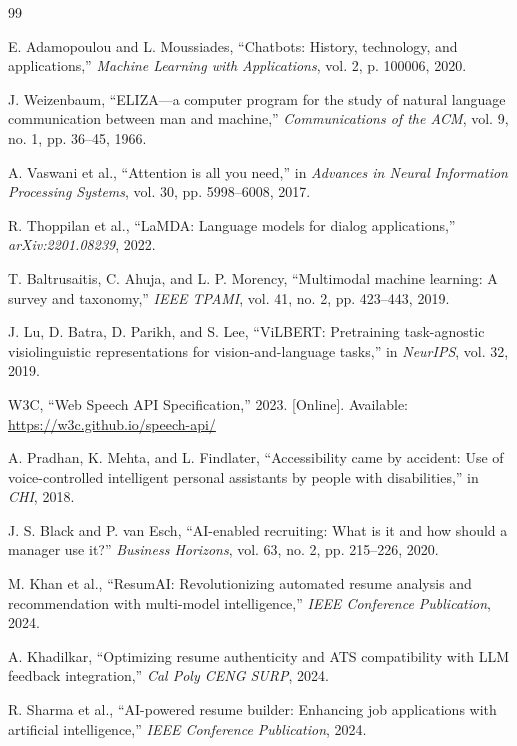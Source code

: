 \documentclass[conference]{IEEEtran}
\begin{document}
\begin{thebibliography}{99}

E. Adamopoulou and L. Moussiades, ``Chatbots: History, technology, and applications,'' \textit{Machine Learning with Applications}, vol. 2, p. 100006, 2020.

J. Weizenbaum, ``ELIZA---a computer program for the study of natural language communication between man and machine,'' \textit{Communications of the ACM}, vol. 9, no. 1, pp. 36--45, 1966.

A. Vaswani et al., ``Attention is all you need,'' in \textit{Advances in Neural Information Processing Systems}, vol. 30, pp. 5998--6008, 2017.

R. Thoppilan et al., ``LaMDA: Language models for dialog applications,'' \textit{arXiv:2201.08239}, 2022.

T. Baltrusaitis, C. Ahuja, and L. P. Morency, ``Multimodal machine learning: A survey and taxonomy,'' \textit{IEEE TPAMI}, vol. 41, no. 2, pp. 423--443, 2019.

J. Lu, D. Batra, D. Parikh, and S. Lee, ``ViLBERT: Pretraining task-agnostic visiolinguistic representations for vision-and-language tasks,'' in \textit{NeurIPS}, vol. 32, 2019.

W3C, ``Web Speech API Specification,'' 2023. [Online]. Available: \url{https://w3c.github.io/speech-api/}

A. Pradhan, K. Mehta, and L. Findlater, ``Accessibility came by accident: Use of voice-controlled intelligent personal assistants by people with disabilities,'' in \textit{CHI}, 2018.

J. S. Black and P. van Esch, ``AI-enabled recruiting: What is it and how should a manager use it?'' \textit{Business Horizons}, vol. 63, no. 2, pp. 215--226, 2020.

M. Khan et al., ``ResumAI: Revolutionizing automated resume analysis and recommendation with multi-model intelligence,'' \textit{IEEE Conference Publication}, 2024.

A. Khadilkar, ``Optimizing resume authenticity and ATS compatibility with LLM feedback integration,'' \textit{Cal Poly CENG SURP}, 2024.

R. Sharma et al., ``AI-powered resume builder: Enhancing job applications with artificial intelligence,'' \textit{IEEE Conference Publication}, 2024.

\end{thebibliography}
\end{document}
